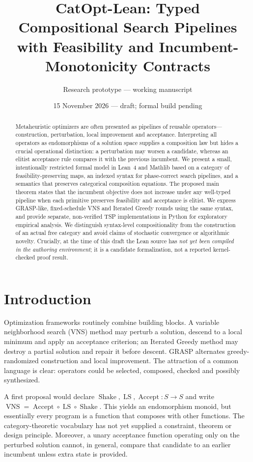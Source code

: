 \documentclass[11pt,a4paper]{article}
\title{CatOpt-Lean: Typed Compositional Search Pipelines\\with Feasibility and Incumbent-Monotonicity Contracts}
\author{Research prototype --- working manuscript}
\date{15 November 2026 --- draft; formal build pending}
\begin{document}
\maketitle
\begin{abstract}
Metaheuristic optimizers are often presented as pipelines of reusable
operators---construction, perturbation, local improvement and acceptance.
Interpreting all operators as endomorphisms of a solution space supplies a
composition law but hides a crucial operational distinction: a perturbation
may worsen a candidate, whereas an elitist acceptance rule compares it with
the previous incumbent. We present a small, intentionally restricted formal
model in Lean~4 and Mathlib based on a category of feasibility-preserving
maps, an indexed syntax for phase-correct search pipelines, and a semantics
that preserves categorical composition equations. The proposed main theorem
states that the incumbent objective does not increase under any well-typed
pipeline when each primitive preserves feasibility and acceptance is elitist.
We express GRASP-like, fixed-schedule VNS and Iterated Greedy rounds using the
same syntax, and provide separate, non-verified TSP implementations in
Python for exploratory empirical analysis. We distinguish syntax-level
compositionality from the construction of an actual free category and avoid
claims of stochastic convergence or algorithmic novelty. Crucially, at the
time of this draft the Lean source has \emph{not yet been compiled in the
authoring environment}; it is a candidate formalization, not a reported
kernel-checked proof result.
\end{abstract}

\section{Introduction}
Optimization frameworks routinely combine building blocks. A variable
neighborhood search (VNS) method may perturb a solution, descend to a local
minimum and apply an acceptance criterion; an Iterated Greedy method may
destroy a partial solution and repair it before descent. GRASP alternates
greedy-randomized construction and local improvement. The attraction of a
common language is clear: operators could be selected, composed, checked and
possibly synthesized.

A first proposal would declare $\operatorname{Shake},\operatorname{LS},
\operatorname{Accept}:S\rightarrow S$ and write
$\operatorname{VNS}=\operatorname{Accept}\circ
\operatorname{LS}\circ\operatorname{Shake}$. This yields an endomorphism
monoid, but essentially every program is a function that composes with
other functions. The category-theoretic vocabulary has not yet supplied a
constraint, theorem or design principle. Moreover, a unary acceptance
function operating only on the perturbed solution cannot, in general,
compare that candidate to an earlier incumbent unless extra state is
provided.
\end{document}
